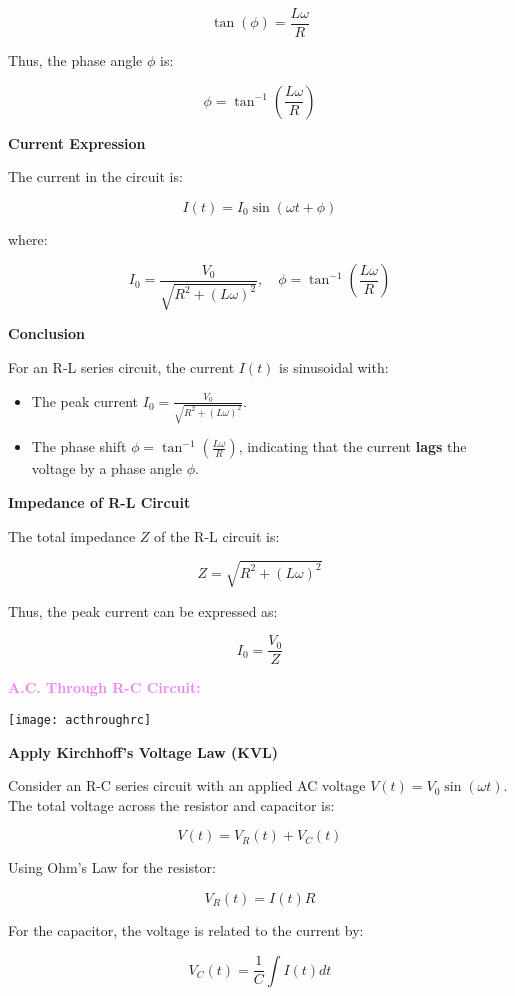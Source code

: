 \documentclass{beamer}
\begin{document}
\begin{frame}


\[
\tan(\phi) = \frac{L \omega}{R}
\]

Thus, the phase angle \( \phi \) is:

\[
\phi = \tan^{-1}\left(\frac{L \omega}{R}\right)
\]

\textbf{Current Expression}

The current in the circuit is:

\[
I(t) = I_0 \sin(\omega t + \phi)
\]

where:

\[
I_0 = \frac{V_0}{\sqrt{R^2 + (L \omega)^2}}, \quad \phi = \tan^{-1}\left(\frac{L \omega}{R}\right)
\]

\textbf{Conclusion}

For an R-L series circuit, the current \( I(t) \) is sinusoidal with:

\end{frame}

\begin{frame}

\begin{itemize}
    \item The peak current \( I_0 = \frac{V_0}{\sqrt{R^2 + (L \omega)^2}} \).
    \item The phase shift \( \phi = \tan^{-1}\left(\frac{L \omega}{R}\right) \), indicating that the current \textbf{lags} the voltage by a phase angle \( \phi \).
\end{itemize}

\textbf{Impedance of R-L Circuit}

The total impedance \( Z \) of the R-L circuit is:

\[
Z = \sqrt{R^2 + (L \omega)^2}
\]

Thus, the peak current can be expressed as:

\[
I_0 = \frac{V_0}{Z}
\]

\end{frame}



\begin{frame}
\textcolor{violet}{\textbf{A.C. Through R-C Circuit:}}
\begin{center}
\texttt{[image: acthroughrc]}
\end{center}
\textbf{Apply Kirchhoff’s Voltage Law (KVL)}

Consider an R-C series circuit with an applied AC voltage \( V(t) = V_0 \sin(\omega t) \). The total voltage across the resistor and capacitor is:

\[
V(t) = V_R(t) + V_C(t)
\]

Using Ohm’s Law for the resistor:

\[
V_R(t) = I(t) R
\]

For the capacitor, the voltage is related to the current by:

\[
V_C(t) = \frac{1}{C} \int I(t) dt
\]

\end{frame}
\end{document}
